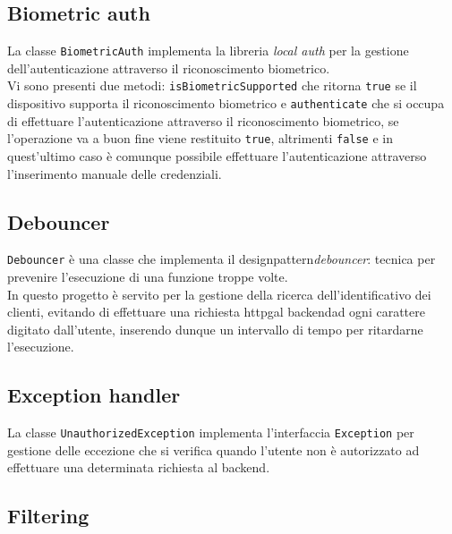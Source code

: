 \subsection{Biometric auth}
\label{subsec:biometric-auth}

La classe \lstinline{BiometricAuth} implementa la libreria \emph{local auth} \cite{site:local-auth} per la gestione dell'autenticazione attraverso il riconoscimento biometrico. \\
Vi sono presenti due metodi: \lstinline{isBiometricSupported} che ritorna \lstinline{true} se il dispositivo supporta il riconoscimento biometrico e \lstinline{authenticate} che si occupa di effettuare l'autenticazione attraverso il riconoscimento biometrico, se l'operazione va a buon fine viene restituito \lstinline{true}, altrimenti \lstinline{false} e in quest'ultimo caso è comunque possibile effettuare l'autenticazione attraverso l'inserimento manuale delle credenziali.

\subsection{Debouncer}
\label{subsec:debouncer}

\lstinline{Debouncer} è una classe che implementa il \gls{designpattern}\glsoccur \emph{debouncer}: tecnica per prevenire l'esecuzione di una funzione troppe volte. \\
In questo progetto è servito per la gestione della ricerca dell'identificativo dei clienti, evitando di effettuare una richiesta \gls{httpg}\glsoccur al \gls{backend}\glsoccur ad ogni carattere digitato dall'utente, inserendo dunque un intervallo di tempo per ritardarne l'esecuzione.

\subsection{Exception handler}
\label{subsec:exception-handler}

La classe \lstinline{UnauthorizedException} implementa l'interfaccia \lstinline{Exception} \cite{site:exception} per gestione delle eccezione che si verifica quando l'utente non è autorizzato ad effettuare una determinata richiesta al \gls{backend}\glsoccur. 

\subsection{Filtering}
\label{subsec:filtering}

